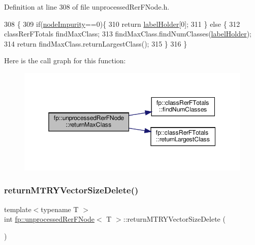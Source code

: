 Definition at line 308 of file unprocessed\+Rer\+F\+Node.\+h.


\begin{DoxyCode}
308                                            \{
309                     \textcolor{keywordflow}{if}(\hyperlink{classfp_1_1unprocessedRerFNode_a5d7bc15c3a0717abefc4845aec168167}{nodeImpurity}==0)\{
310                         \textcolor{keywordflow}{return} \hyperlink{classfp_1_1unprocessedRerFNode_a9e1a9728861a19034c9b17d5eaa2891d}{labelHolder}[0];
311                     \} \textcolor{keywordflow}{else} \{
312                         classRerFTotals findMaxClass;
313                         findMaxClass.findNumClasses(\hyperlink{classfp_1_1unprocessedRerFNode_a9e1a9728861a19034c9b17d5eaa2891d}{labelHolder});
314                         \textcolor{keywordflow}{return} findMaxClass.returnLargestClass();
315                     \}
316                 \}
\end{DoxyCode}
Here is the call graph for this function\+:
\nopagebreak
\begin{figure}[H]
\begin{center}
\leavevmode
\includegraphics[width=350pt]{classfp_1_1unprocessedRerFNode_a656fca7854eae97dae1b93082d703606_cgraph}
\end{center}
\end{figure}
\mbox{\label{classfp_1_1unprocessedRerFNode_a436990a7a7e08ded050ffe55c585e605}} 
\subsubsection{\texorpdfstring{return\+M\+T\+R\+Y\+Vector\+Size\+Delete()}{returnMTRYVectorSizeDelete()}}
{\footnotesize\ttfamily template$<$typename T $>$ \\
int \hyperlink{classfp_1_1unprocessedRerFNode}{fp\+::unprocessed\+Rer\+F\+Node}$<$ T $>$\+::return\+M\+T\+R\+Y\+Vector\+Size\+Delete (\begin{DoxyParamCaption}{ }\end{DoxyParamCaption})\hspace{0.3cm}{\ttfamily [inline]}}



